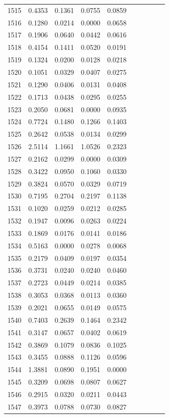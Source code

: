 \begin{table}
\begin{tabular}{cccccccccc}
1515& 0.4353& 0.1361& 0.0755& 0.0859\\ 
1516& 0.1280& 0.0214& 0.0000& 0.0658\\ 
1517& 0.1906& 0.0640& 0.0442& 0.0616\\ 
1518& 0.4154& 0.1411& 0.0520& 0.0191\\ 
1519& 0.1324& 0.0200& 0.0128& 0.0218\\ 
1520& 0.1051& 0.0329& 0.0407& 0.0275\\ 
1521& 0.1290& 0.0406& 0.0131& 0.0408\\ 
1522& 0.1713& 0.0438& 0.0295& 0.0255\\ 
1523& 0.2050& 0.0681& 0.0000& 0.0935\\ 
1524& 0.7724& 0.1480& 0.1266& 0.1403\\ 
1525& 0.2642& 0.0538& 0.0134& 0.0299\\ 
1526& 2.5114& 1.1661& 1.0526& 0.2323\\ 
1527& 0.2162& 0.0299& 0.0000& 0.0309\\ 
1528& 0.3422& 0.0950& 0.1060& 0.0330\\ 
1529& 0.3824& 0.0570& 0.0329& 0.0719\\ 
1530& 0.7195& 0.2704& 0.2197& 0.1138\\ 
1531& 0.1020& 0.0259& 0.0212& 0.0285\\ 
1532& 0.1947& 0.0096& 0.0263& 0.0224\\ 
1533& 0.1869& 0.0176& 0.0141& 0.0186\\ 
1534& 0.5163& 0.0000& 0.0278& 0.0068\\ 
1535& 0.2179& 0.0409& 0.0197& 0.0354\\ 
1536& 0.3731& 0.0240& 0.0240& 0.0460\\ 
1537& 0.2723& 0.0449& 0.0214& 0.0385\\ 
1538& 0.3053& 0.0368& 0.0113& 0.0360\\ 
1539& 0.2021& 0.0655& 0.0149& 0.0575\\ 
1540& 0.7403& 0.2639& 0.1464& 0.2342\\ 
1541& 0.3147& 0.0657& 0.0402& 0.0619\\ 
1542& 0.3869& 0.1079& 0.0836& 0.1025\\ 
1543& 0.3455& 0.0888& 0.1126& 0.0596\\ 
1544& 1.3881& 0.0890& 0.1951& 0.0000\\ 
1545& 0.3209& 0.0698& 0.0807& 0.0627\\ 
1546& 0.2915& 0.0320& 0.0211& 0.0443\\ 
1547& 0.3973& 0.0788& 0.0730& 0.0827\\ 

\end{tabular}
\end{table}
